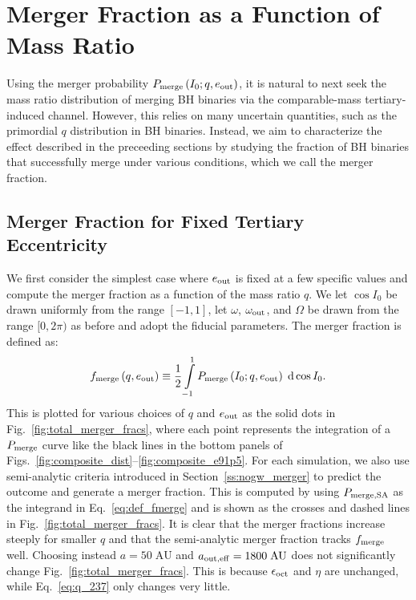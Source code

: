 \documentclass[
        fleqn,
        usenatbib,
    ]{mnras}
\newcommand*{\p}[1]{\left(#1\right)}
\begin{document}
\section{Merger Fraction as a Function of Mass Ratio}\label{s:merger_frac}

Using the merger probability $P_{\rm merge}\p{I_0; q, e_{\rm out}}$, it is
natural to next seek the mass ratio distribution of merging BH binaries via the
comparable-mass tertiary-induced channel. However, this relies on many uncertain
quantities, such as the primordial $q$ distribution in BH binaries. Instead, we
aim to characterize the effect described in the preceeding sections by studying
the fraction of BH binaries that successfully merge under various conditions,
which we call the merger fraction.

\subsection{Merger Fraction for Fixed Tertiary Eccentricity}

We first consider the simplest case where $e_{\rm out}$ is fixed at a few
specific values and compute the merger fraction as a function of the mass ratio
$q$. We let $\cos I_0$ be drawn uniformly from the range $[-1, 1]$, let
$\omega$, $\omega_{\rm out}$, and $\Omega$ be drawn from the range $[0,
2\pi)$ as before %
and adopt the fiducial parameters. The merger fraction is defined as:
\begin{equation}
    f_{\rm merge}\p{q, e_{\rm out}} \equiv
        \frac{1}{2}\int\limits_{-1}^1P_{\rm merge}\p{I_0; q, e_{\rm out}}
            \;\mathrm{d}\cos I_0.\label{eq:def_fmerge}
\end{equation}
This is plotted for various choices of $q$ and $e_{\rm out}$ as the solid dots in
Fig.~\ref{fig:total_merger_fracs}, where each point represents the integration
of a $P_{\rm merge}$ curve like the black lines in the bottom panels of
Figs.~\ref{fig:composite_dist}--\ref{fig:composite_e91p5}. For each simulation,
we also use semi-analytic criteria introduced in Section~\ref{ss:nogw_merger} to
predict the outcome and generate a merger fraction. This is computed by using
$P_{\rm merge, SA}$ as the integrand in Eq.~\eqref{eq:def_fmerge} and is shown
as the crosses and dashed lines in Fig.~\ref{fig:total_merger_fracs}. It is
clear that the merger fractions increase steeply for smaller $q$ and that the
semi-analytic merger fraction tracks $f_{\rm merge}$ well. Choosing instead $a =
50\;\mathrm{AU}$ and $a_{\rm out, eff} = 1800\;\mathrm{AU}$ does not
significantly change Fig.~\ref{fig:total_merger_fracs}. This is because
$\epsilon_{\rm oct}$ and $\eta$ are unchanged, while Eq.~\eqref{eq:q_237} only
changes very little.
\end{document}
